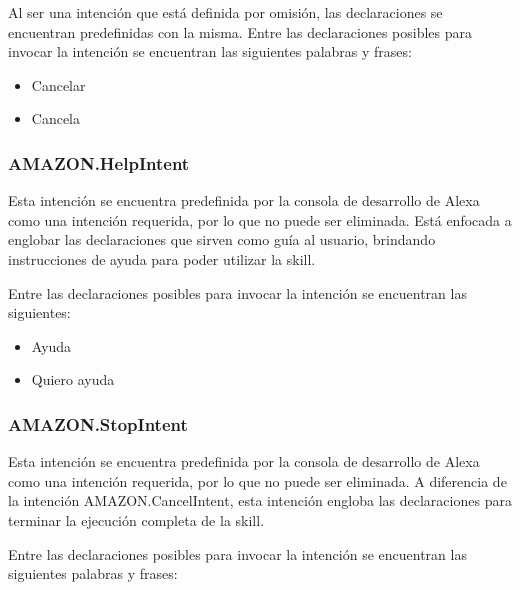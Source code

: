Al ser una intención que está definida por omisión, las declaraciones se encuentran predefinidas con la misma. Entre las declaraciones posibles para invocar la intención se encuentran las siguientes palabras y frases:

\begin{itemize}
  \item Cancelar
  \item Cancela
\end{itemize}


\subsubsection{AMAZON.HelpIntent}
\label{HelpIntentcapIV}

Esta intención se encuentra predefinida por la consola de desarrollo de Alexa como una intención requerida, por lo que no puede ser eliminada. Está enfocada a englobar las declaraciones que sirven como guía al usuario, brindando instrucciones de ayuda para poder utilizar la skill.

Entre las declaraciones posibles para invocar la intención se encuentran las siguientes:

\begin{itemize}
  \item Ayuda
  \item Quiero ayuda
\end{itemize}


\subsubsection{AMAZON.StopIntent}
\label{StopIntentcapIV}

Esta intención se encuentra predefinida por la consola de desarrollo de Alexa como una intención requerida, por lo que no puede ser eliminada. A diferencia de la intención AMAZON.CancelIntent, esta intención engloba las declaraciones para terminar la ejecución completa de la skill.

Entre las declaraciones posibles para invocar la intención se encuentran las siguientes palabras y frases:

